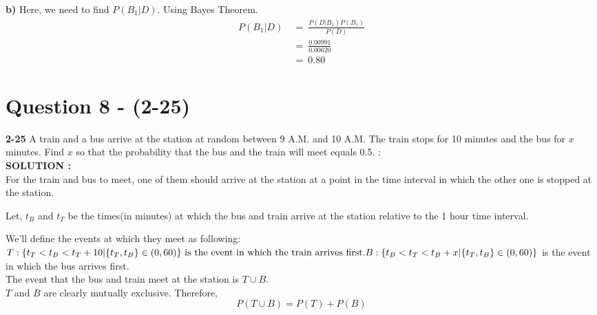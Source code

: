 \documentclass{article}
\begin{document}
\textbf{b)} Here, we need to find $P(B_1|D)$. Using Bayes Theorem.
\begin{equation*}
    \begin{split}
        P(B_1|D)\ &=\ \frac{P(D|B_1)P(B_1)}{P(D)} \\
              &=\ \frac{0.00991}{0.00620}\\
              &=\ 0.80
    \end{split} 
\end{equation*}

\section{Question 8 - (2-25)}
\label{Q8}
\textbf{2-25} A train and a bus arrive at the station at random between 9 A.M. and 10 A.M. The train stops for 10 minutes and the bus for $x$ minutes. Find $x$ so that the probability that the bus and the train will meet equals 0.5. : \\

\hspace{1em} \large{\textbf{SOLUTION :}} \\
    For the train and bus to meet, one of them should
arrive at the station at a point in the time interval in which the other one is stopped at the station.

Let, $t_B$ and $t_T$ be the times(in minutes) at which the bus and train arrive at the station relative to the 1 hour time interval.

We'll define the events at which they meet as following:\\
$T : \{t_T < t_B < t_T+10 | \{t_T,t_B\}\in(0,60)\} \text{ is the event in which the train arrives first.}\\
B : \{t_B < t_T < t_B+x | \{t_T,t_B\}\in(0,60)\}$ is the event in which the bus arrives first.\\
The event that the bus and train meet at the station is $T\cup B$.\\

$T$ and $B$ are clearly mutually exclusive. Therefore,\\
$$P(T\cup B) = P(T) + P(B)$$
\end{document}
